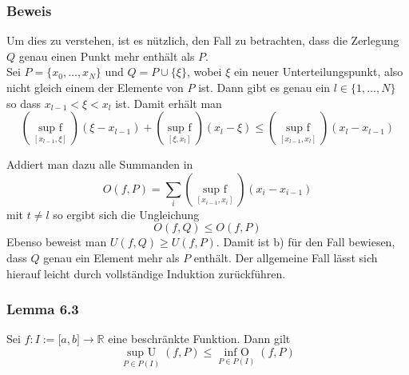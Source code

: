 \subsubsection*{Beweis} 
Um dies zu verstehen, ist es nützlich, den Fall zu betrachten, dass die Zerlegung $Q$ genau einen Punkt mehr enthält als $P$.\\

Sei $P=\{x_0,\dots ,x_N\}$ und $Q=P\cup \{\xi\}$, wobei $\xi$ ein neuer Unterteilungspunkt, also nicht gleich einem der Elemente von $P$ ist. Dann gibt es genau ein $l\in \{ 1,\dots,N\}$ so dass $x_{l-1}<\xi <x_l$ ist. Damit erhält man $$(\mathop {\sup {\text{ }}f}\limits_{[{x_{l - 1}},\xi ]} )(\xi  - {x_{l - 1}}) + (\mathop {\sup {\text{ }}f}\limits_{[\xi ,{x_l}]} )({x_l} - \xi ) \le (\mathop {\sup {\text{ }}f}\limits_{[{x_{l - 1}},{x_l}]} )({x_l} - {x_{l - 1}})$$


\begin{center}
\end{center}


Addiert man dazu alle Summanden in $$O(f,P)=\sum\limits_i {(\mathop {\sup {\text{ }}f}\limits_{[{x_{i - 1}},{x_i}]} )({x_i} - {x_{i - 1}})} $$
mit $t\neq l$ so ergibt sich die Ungleichung $$O(f,Q)\leq O(f,P)$$
Ebenso beweist man $U(f,Q)\geq U(f,P)$. Damit ist b) für den Fall bewiesen, dass $Q$ genau ein Element mehr als $P$ enthält. Der allgemeine Fall lässt sich hierauf leicht durch vollständige Induktion zurückführen. 

\subsubsection*{Lemma 6.3} Sei $f:I:=\lbrack a,b \rbrack \rightarrow \mathbb{R}$ eine beschränkte Funktion. Dann gilt $$\mathop {\sup {\text{ }}U}\limits_{P \in P(I)} (f,P) \le \mathop {\inf {\text{ }}O}\limits_{P \in P(I)} (f,P)$$

